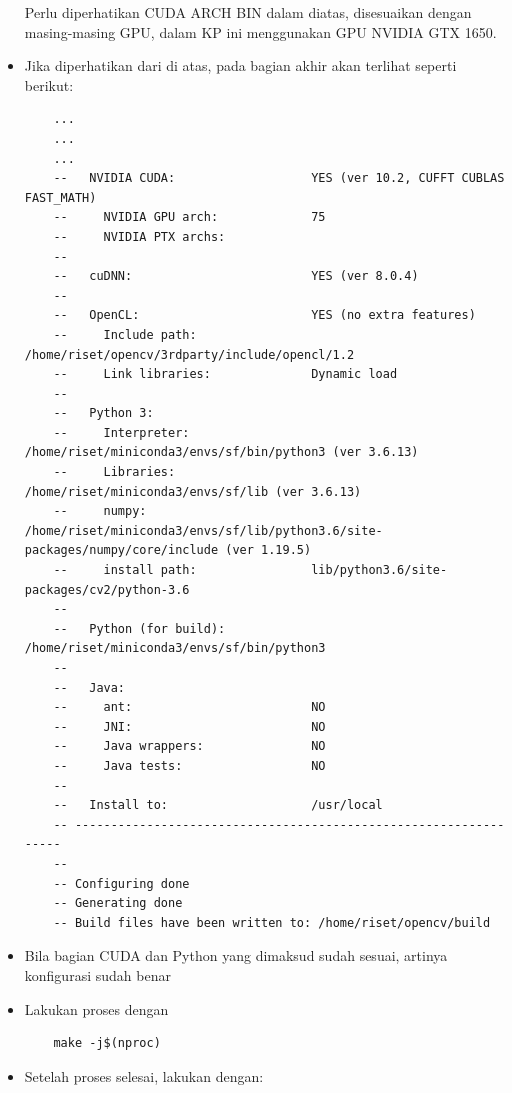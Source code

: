 \begin{itemize}
  Perlu diperhatikan CUDA ARCH BIN dalam  diatas, disesuaikan dengan  masing-masing GPU, dalam KP ini menggunakan GPU NVIDIA GTX 1650.

  \item Jika diperhatikan  dari  di atas, pada bagian akhir akan terlihat seperti berikut:
  
  \begin{lstlisting}
    ...
    ...
    ...
    --   NVIDIA CUDA:                   YES (ver 10.2, CUFFT CUBLAS FAST_MATH)
    --     NVIDIA GPU arch:             75
    --     NVIDIA PTX archs:
    -- 
    --   cuDNN:                         YES (ver 8.0.4)
    -- 
    --   OpenCL:                        YES (no extra features)
    --     Include path:                /home/riset/opencv/3rdparty/include/opencl/1.2
    --     Link libraries:              Dynamic load
    -- 
    --   Python 3:
    --     Interpreter:                 /home/riset/miniconda3/envs/sf/bin/python3 (ver 3.6.13)
    --     Libraries:                   /home/riset/miniconda3/envs/sf/lib (ver 3.6.13)
    --     numpy:                       /home/riset/miniconda3/envs/sf/lib/python3.6/site-packages/numpy/core/include (ver 1.19.5)
    --     install path:                lib/python3.6/site-packages/cv2/python-3.6
    -- 
    --   Python (for build):            /home/riset/miniconda3/envs/sf/bin/python3
    -- 
    --   Java:                          
    --     ant:                         NO
    --     JNI:                         NO
    --     Java wrappers:               NO
    --     Java tests:                  NO
    -- 
    --   Install to:                    /usr/local
    -- -----------------------------------------------------------------
    -- 
    -- Configuring done
    -- Generating done
    -- Build files have been written to: /home/riset/opencv/build
  \end{lstlisting}

  \item Bila bagian CUDA dan Python  yang dimaksud sudah sesuai, artinya konfigurasi sudah benar
  \item Lakukan proses  dengan
  
  \begin{lstlisting}
    make -j$(nproc)
  \end{lstlisting}

  \item Setelah proses selesai, lakukan  dengan:
  

\end{itemize}
